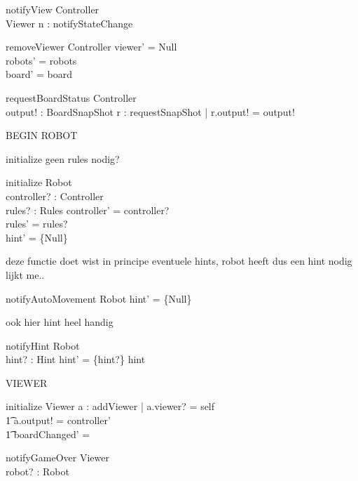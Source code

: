 \documentclass[a4paper,11pt]{article}
\begin{document}
\begin{schema}{notifyView}
\Xi Controller \\
\Delta Viewer
\where
\exists n : notifyStateChange
\end{schema}

\begin{schema}{removeViewer}
\Delta Controller 
\where
viewer' = Null \\
robots' = robots \\
board' = board
\end{schema}

\begin{schema}{requestBoardStatus}
\Xi Controller \\
output! : BoardSnapShot
\where
\exists r : requestSnapShot | r.output! = output!
\end{schema}


BEGIN ROBOT

initialize geen rules nodig?
\begin{schema}{initialize}
\Delta Robot \\
controller? : Controller \\
rules? : Rules
\where
controller' = controller? \\
rules' = rules? \\
hint' = \{Null\}
\end{schema}

deze functie doet wist in principe eventuele hints, robot heeft dus een hint nodig lijkt me..
\begin{schema}{notifyAutoMovement}
\Delta Robot
\where
hint' = \{Null\}
\end{schema}

ook hier hint heel handig
\begin{schema}{notifyHint}
\Delta Robot \\
hint? : Hint
\where
hint' = \{hint?\} \union hint
\end{schema}

VIEWER

\begin{schema}{initialize}
\Delta Viewer
\where
\exists a : addViewer | a.viewer? = self \implies \\ \t1
a.output! = controller' \\ \t1
boardChanged' = \false
\end{schema}

\begin{schema}{notifyGameOver}
\Delta Viewer \\
robot? : Robot
\where
\end{schema}
\end{document}
